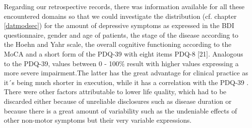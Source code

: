 \documentclass[number,12pt,review]{elsarticle}
\begin{document}
Regarding our retrospective records, there was information available for all these encountered domains so that we could investigate the distribution (cf. chapter \ref{datmodsec}) for the amount of depressive symptoms as expressed in the \ac{BDI} questionnaire, gender and age of patients, the stage of the disease according to the Hoehn and Yahr scale, the overall cognitive functioning according to the \ac{MoCA}\citep{nasreddine2005montreal} and a short form of the \ac{PDQ-39} with eight items \acs{PDQ-8} [21]. Analogous to the \ac{PDQ-39}, values between 0 - 100\% result with higher values expressing a more severe impairment.The latter has the great advantage for clinical practice as it´s being much shorter in execution, while it has a correlation with the PDQ-39 \citep{chen2017evaluation}. There were other factors attributable to lower life quality, which had to be discarded either because of unreliable disclosures such as disease duration \citep{Benge2016-wp} or because there is a great amount of variability such as the undeniable effects of other non-motor symptoms \citep{Wu2014-pk, Zipprich2021-vv} but their very variable expressions.
	
\begin{table}[!ht]
\end{table}
\end{document}
